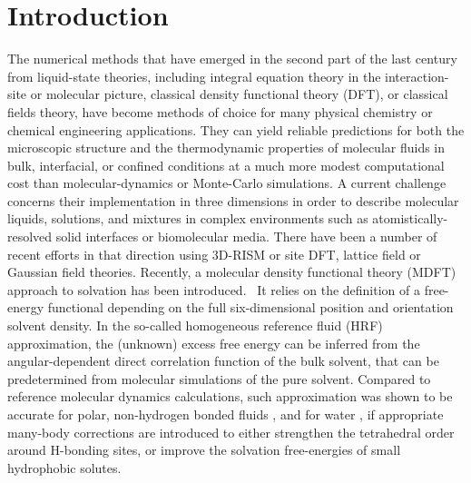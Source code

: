 \documentclass[aip,jcp,showpacs,amsmath,amssymb,superscriptaddress]{revtex4-1}
\begin{document}
\section{Introduction}

The numerical  methods that have emerged in the second part of the last century from  liquid-state theories\cite{hansen, gray-gubbins-vol1}, including integral equation theory in the interaction-site\cite{Chandler-RISM,hirata-rossky81,hirata-pettitt-rossky82,reddy03,pettitt07,pettitt08}
or molecular\cite{blum72a,blum72b,patey77,fries-patey85,richardi98,richardi99} picture, classical density functional theory (DFT)\cite{evans79,evans92,Wu07}, or classical fields theory\cite{chandler93,lum99,coalson96}, have become methods of choice for 
many physical chemistry or chemical engineering applications\cite{gray-gubbins-vol2,neimark06,neimark11,wu06}. They can yield reliable predictions for both the microscopic structure and the thermodynamic properties of molecular fluids in bulk, interfacial, or confined conditions at a much more modest computational cost than  molecular-dynamics or Monte-Carlo simulations. 
A current challenge concerns their implementation in three dimensions in order to describe molecular liquids, solutions, and mixtures in  complex environments such as atomistically-resolved solid interfaces or biomolecular media. There have been a number of recent efforts in that direction using 3D-RISM\cite{Beglov-Roux97,kovalenko-hirata98,red-book,yoshida09,kloss08-jcp,kloss08-jpcb} or site DFT\cite{liu13}, lattice field\cite{azuara06,azuara08} or Gaussian field\cite{lum99,tenwolde01,tenwolde02,huang02,varilly11,chandler-varilly11} theories.
Recently, a molecular density functional theory (MDFT) approach to solvation has been
introduced.~\cite{ramirez02,ramirez05-CP,ramirez05,gendre09,zhao11,borgis12,levesque12_1,levesque12_2,jeanmairet13} It relies on the definition of a free-energy functional depending on the full six-dimensional position and orientation solvent density. In the so-called homogeneous reference fluid (HRF) approximation, the (unknown) excess free energy can be inferred from the angular-dependent direct correlation function of the bulk solvent,
that can be predetermined from molecular simulations of the pure solvent. Compared to reference molecular dynamics calculations, such approximation was shown to be accurate for polar, non-hydrogen bonded fluids \cite{ramirez02,gendre09,zhao11,borgis12,levesque12_2}, and for water \cite{zhao11,jeanmairet13,levesque12_1}, if appropriate many-body corrections are introduced to either strengthen the tetrahedral order around H-bonding sites\cite{zhao11,jeanmairet13}, or improve the solvation free-energies of small hydrophobic solutes\cite{levesque12_1}.
\end{document}

